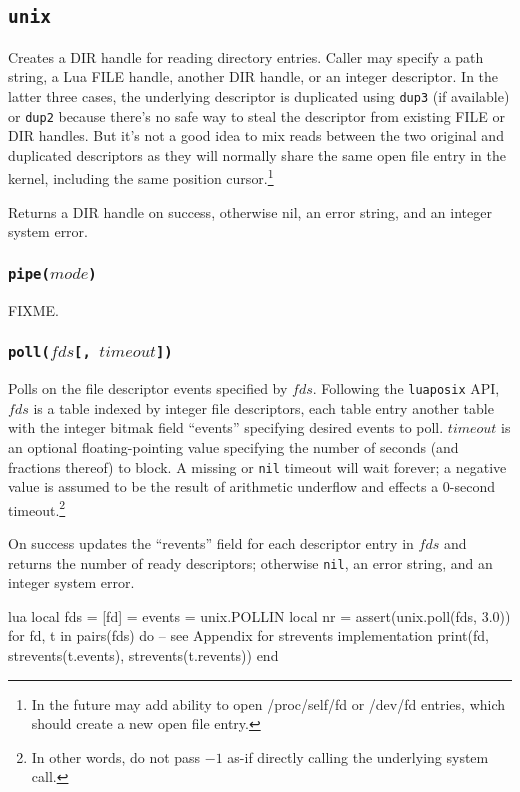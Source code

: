 \documentclass[11pt, oneside]{memoir}
\newcommand*{\luaposix}[0]{\texttt{luaposix}\xspace}
\newcommand*{\nil}[0]{\texttt{nil}\xspace}
\newcommand*{\syscall}[1]{\texttt{#1}\xspace}
\newcommand*{\fn}[1]{\texttt{#1}\xspace}
\newcommand*{\otherwise}[1]{otherwise #1, an error string, and an integer system error}
\newcounter{toccols}
\newenvironment{Module}[1]{
	\subsection{\texttt{#1}}
	\addtocontents{toc}{
		\protect\begin{multicols}{\value{toccols}}
	}
}{
	\addtocontents{toc}{\protect\end{multicols}}
}
\begin{document}
\begin{Module}{unix}
Creates a DIR handle for reading directory entries. Caller may specify a path string, a Lua FILE handle, another DIR handle, or an integer descriptor. In the latter three cases, the underlying descriptor is duplicated using \syscall{dup3} (if available) or \syscall{dup2} because there's no safe way to steal the descriptor from existing FILE or DIR handles. But it's not a good idea to mix reads between the two original and duplicated descriptors as they will normally share the same open file entry in the kernel, including the same position cursor.\footnote{In the future may add ability to open /proc/self/fd or /dev/fd entries, which should create a new open file entry.}

Returns a DIR handle on success, otherwise nil, an error string, and an integer system error.

\subsubsection[\fn{pipe}]{\fn{pipe($mode$)}}

FIXME.

\subsubsection[\fn{poll}]{\fn{poll($fds$[, $timeout$])}}

Polls on the file descriptor events specified by $fds$. Following the \luaposix API, $fds$ is a table indexed by integer file descriptors, each table entry another table with the integer bitmak field ``events'' specifying desired events to poll. $timeout$ is an optional floating-pointing value specifying the number of seconds (and fractions thereof) to block. A missing or \nil timeout will wait forever; a negative value is assumed to be the result of arithmetic underflow and effects a 0-second timeout.\footnote{In other words, do not pass $-1$ as-if directly calling the underlying system call.}

On success updates the ``revents'' field for each descriptor entry in $fds$ and returns the number of ready descriptors; \otherwise{\nil}.

\begin{example}{lua}
local fds = { [fd] = { events = unix.POLLIN } }
local nr = assert(unix.poll(fds, 3.0))
for fd, t in pairs(fds) do
  -- see Appendix for strevents implementation
  print(fd, strevents(t.events), strevents(t.revents))
end
\end{example}


\end{Module}
\end{document}

